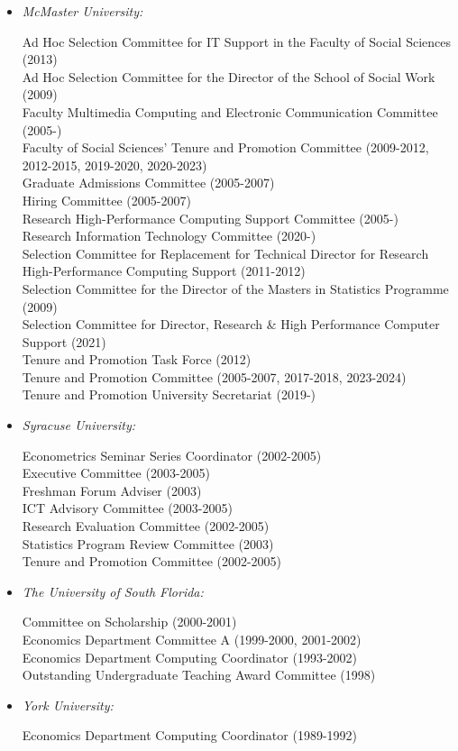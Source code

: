\documentclass[
]{article}
\begin{document}
\begin{itemize}
\item
  \emph{McMaster University:}

  Ad Hoc Selection Committee for IT Support in the Faculty of Social
  Sciences (2013)\\
  Ad Hoc Selection Committee for the Director of the School of Social
  Work (2009)\\
  Faculty Multimedia Computing and Electronic Communication Committee
  (2005-)\\
  Faculty of Social Sciences' Tenure and Promotion Committee (2009-2012,
  2012-2015, 2019-2020, 2020-2023)\\
  Graduate Admissions Committee (2005-2007)\\
  Hiring Committee (2005-2007)\\
  Research High-Performance Computing Support Committee (2005-)\\
  Research Information Technology Committee (2020-)\\
  Selection Committee for Replacement for Technical Director for
  Research High-Performance Computing Support (2011-2012)\\
  Selection Committee for the Director of the Masters in Statistics
  Programme (2009)\\
  Selection Committee for Director, Research \& High Performance
  Computer Support (2021)\\
  Tenure and Promotion Task Force (2012)\\
  Tenure and Promotion Committee (2005-2007, 2017-2018, 2023-2024)\\
  Tenure and Promotion University Secretariat (2019-)
\item
  \emph{Syracuse University:}

  Econometrics Seminar Series Coordinator (2002-2005)\\
  Executive Committee (2003-2005)\\
  Freshman Forum Adviser (2003)\\
  ICT Advisory Committee (2003-2005)\\
  Research Evaluation Committee (2002-2005)\\
  Statistics Program Review Committee (2003)\\
  Tenure and Promotion Committee (2002-2005)
\item
  \emph{The University of South Florida:}

  Committee on Scholarship (2000-2001)\\
  Economics Department Committee A (1999-2000, 2001-2002)\\
  Economics Department Computing Coordinator (1993-2002)\\
  Outstanding Undergraduate Teaching Award Committee (1998)
\item
  \emph{York University:}

  Economics Department Computing Coordinator (1989-1992)
\end{itemize}
\end{document}
